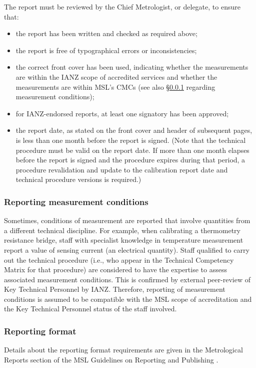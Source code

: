 The report must be reviewed by the Chief Metrologist, or delegate, to ensure that:
\begin{itemize}
\item the report has been written and checked as required above;
\item the report is free of typographical errors or inconsistencies;
\item the correct front cover has been used, indicating whether the measurements are within the IANZ scope of accredited services and whether the measurements are within MSL's CMCs (see also \S\ref{sss:measurement_conditions} regarding measurement conditions);
\item for IANZ-endorsed reports, at least one signatory has been approved;
\item the report date, as stated on the front cover and header of subsequent pages, is less than one month before the report is signed. (Note that the technical procedure must be valid on the report date. If more than one month elapses before the report is signed and the procedure expires during that period, a procedure revalidation and update to the calibration report date and technical procedure versions is required.)
\end{itemize} 

\subsubsection{Reporting measurement conditions}
\label{sss:measurement_conditions}
Sometimes, conditions of measurement are reported that involve quantities from a different technical discipline. For example, when calibrating a thermometry resistance bridge, staff with specialist knowledge in temperature measurement report a value of sensing current (an electrical quantity). Staff qualified to carry out the technical procedure (i.e., who appear in the Technical Competency Matrix for that procedure) are considered to have the expertise to assess associated measurement conditions. This is confirmed by external peer-review of Key Technical Personnel by IANZ. Therefore, reporting of measurement conditions is assumed to be compatible with the MSL scope of accreditation and the Key Technical Personnel status of the staff involved.

\subsubsection{Reporting format}
Details about the reporting format requirements are given in the Metrological Reports section of the MSL Guidelines on Reporting and Publishing \cite[\S\ref*{GRP-s:metrological_reports}]{MSL_Reporting_Guidelines}.

